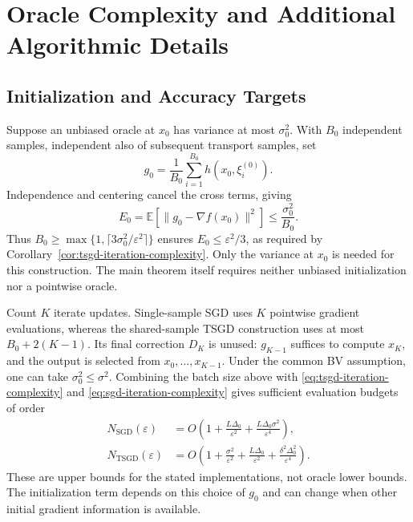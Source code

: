 \section{Oracle Complexity and Additional Algorithmic Details}
\label{app:oracle-complexity}

\subsection{Initialization and Accuracy Targets}
\label{app:initialization-cost}

Suppose an unbiased oracle at $x_0$ has variance at most $\sigma_0^2$.
With $B_0$ independent samples, independent also of subsequent
transport samples, set
\[
g_0=\frac1{B_0}\sum_{i=1}^{B_0}h(x_0,\xi_i^{(0)}).
\]
Independence and centering cancel the cross terms, giving
\[
E_0=\mathbb E[\|g_0-\nabla f(x_0)\|^2]
\leq\frac{\sigma_0^2}{B_0}.
\]
Thus
$B_0\geq\max\{1,\lceil3\sigma_0^2/\varepsilon^2\rceil\}$
ensures $E_0\leq\varepsilon^2/3$, as required by
Corollary~\ref{cor:tsgd-iteration-complexity}. Only the variance at
$x_0$ is needed for this construction. The main theorem itself
requires neither unbiased initialization nor a pointwise oracle.

Count $K$ iterate updates. Single-sample SGD uses $K$ pointwise
gradient evaluations, whereas the shared-sample TSGD construction
uses at most $B_0+2(K-1)$. Its final correction $D_K$ is unused:
$g_{K-1}$ suffices to compute $x_K$, and the output is selected from
$x_0,\ldots,x_{K-1}$. Under the common BV assumption, one can take
$\sigma_0^2\leq\sigma^2$. Combining the batch size above with
\eqref{eq:tsgd-iteration-complexity} and
\eqref{eq:sgd-iteration-complexity} gives sufficient evaluation
budgets of order
\begin{equation}
\label{eq:comparison-oracle-complexities}
\begin{aligned}
N_{\mathrm{SGD}}(\varepsilon)
 &=O\!\left(1+\frac{L\Delta_0}{\varepsilon^2}
              +\frac{L\Delta_0\sigma^2}{\varepsilon^4}\right),\\
N_{\mathrm{TSGD}}(\varepsilon)
 &=O\!\left(1+\frac{\sigma^2}{\varepsilon^2}
              +\frac{L\Delta_0}{\varepsilon^2}
              +\frac{\delta^2\Delta_0^2}{\varepsilon^4}\right).
\end{aligned}
\end{equation}
These are upper bounds for the stated implementations, not oracle
lower bounds. The initialization term depends on this choice of
$g_0$ and can change when other initial gradient information is
available.

